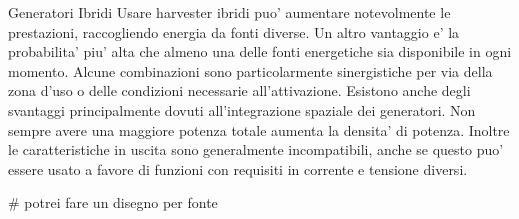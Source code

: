 \begin{section}{Generatori Ibridi}
    Usare harvester ibridi puo' aumentare notevolmente le prestazioni, raccogliendo energia da fonti diverse. Un altro vantaggio e' la probabilita' piu' alta che almeno una delle fonti energetiche sia disponibile in ogni momento. Alcune combinazioni sono particolarmente sinergistiche per via della zona d'uso o delle condizioni necessarie all'attivazione. Esistono anche degli svantaggi principalmente dovuti all'integrazione spaziale dei generatori. Non sempre avere una maggiore potenza totale aumenta la densita' di potenza. Inoltre le caratteristiche in uscita sono generalmente incompatibili, anche se questo puo' essere usato a favore di funzioni con requisiti in corrente e tensione diversi\cite{shaukatApplicationsSustainableHybrid2023}.
\end{section}

\# potrei fare un disegno per fonte

